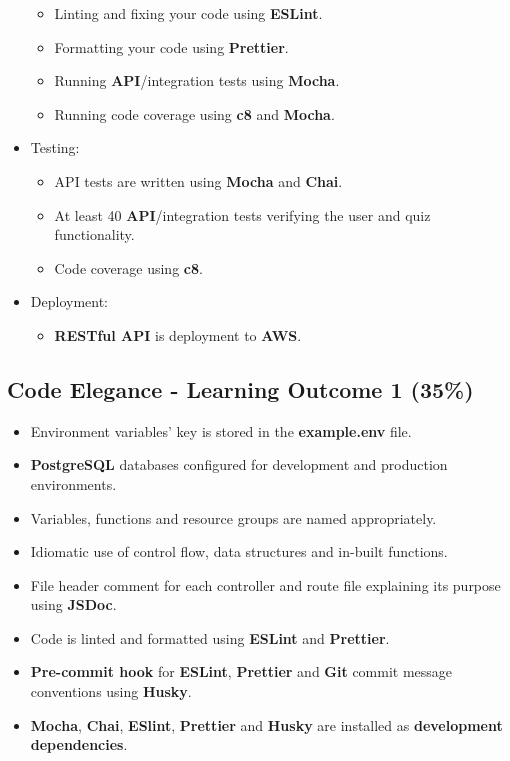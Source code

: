 \documentclass{article}
\begin{document}
\begin{itemize}
\begin{itemize}
		\item Linting and fixing your code using \textbf{ESLint}.
		\item Formatting your code using \textbf{Prettier}.
		\item Running \textbf{API}/integration tests using \textbf{Mocha}.
		\item Running code coverage using \textbf{c8} and \textbf{Mocha}.
	\end{itemize}
	\item Testing:
	\begin{itemize}
		\item API tests are written using \textbf{Mocha} and \textbf{Chai}.
		\item At least 40 \textbf{API}/integration tests verifying the user and quiz functionality.
		\item Code coverage using \textbf{c8}. 
	\end{itemize}
	\item Deployment:
	\begin{itemize}
		\item \textbf{RESTful API} is deployment to \textbf{AWS}. 
	\end{itemize}
\end{itemize}

\subsection*{Code Elegance - Learning Outcome 1 (35\%)}
\begin{itemize}
	\item Environment variables' key is stored in the \textbf{example.env} file. 
	\item \textbf{PostgreSQL} databases configured for development and production environments.
	\item Variables, functions and resource groups are named appropriately.
	\item Idiomatic use of control flow, data structures and in-built functions.
	\item File header comment for each controller and route file explaining its purpose using \textbf{JSDoc}.
	\item Code is linted and formatted using \textbf{ESLint} and \textbf{Prettier}.
	\item \textbf{Pre-commit hook} for \textbf{ESLint}, \textbf{Prettier} and \textbf{Git} commit message conventions using \textbf{Husky}.
	\item \textbf{Mocha}, \textbf{Chai}, \textbf{ESlint}, \textbf{Prettier} and \textbf{Husky} are installed as \textbf{development dependencies}.	
\end{itemize}
\end{document}
